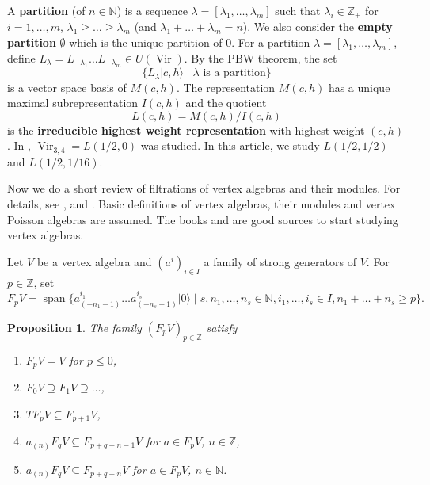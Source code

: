 \documentclass[12pt,a4paper]{article}
\newtheorem{proposition}{Proposition}
\DeclareMathOperator{\Vir}{Vir}
\DeclareMathOperator{\vspan}{span}
\newcommand{\vac}{|0\rangle}
\begin{document}
A \textbf{partition} (of $n\in \mathbb{N}$) is a sequence $\lambda=[\lambda_1,\dots, \lambda_m]$ such that $\lambda_i\in \mathbb{Z}_+$ for $i=1,\dots,m$, $\lambda_1\ge\dots\ge\lambda_m$ (and $\lambda_1+\dots+\lambda_m=n$).
We also consider the \textbf{empty partition} $\emptyset$ which is the unique partition of $0$.
For a partition $\lambda=[\lambda_1,\dots,\lambda_m]$, define $L_{\lambda}=L_{-\lambda_1}\dots L_{-\lambda_m}\in U(\Vir)$.
By the PBW theorem, the set
\begin{equation*}
  \{L_\lambda|c,h\rangle\mid \lambda\text{ is a partition}\}
\end{equation*}
is a vector space basis of $M(c,h)$.
The representation $M(c,h)$ has a unique maximal subrepresentation $I(c,h)$ and the quotient
\begin{equation*}
  L(c,h)=M(c,h)/I(c,h)
\end{equation*}
is the \textbf{irreducible highest weight representation} with highest weight $(c,h)$.
In \cite{andrews_singular_2022}, $\Vir_{3,4}=L(1/2,0)$ was studied.
In this article, we study $L(1/2,1/2)$ and $L(1/2,1/16)$.

Now we do a short review of filtrations of vertex algebras and their modules.
For details, see \cite{li_vertex_2002}, \cite{arakawa_remark_2012} and \cite{li_abelianizing_2005}.
Basic definitions of vertex algebras, their modules and vertex Poisson algebras are assumed.
The books \cite{kac_vertex_1998} and \cite{frenkel_vertex_2004} are good sources to start studying vertex algebras.

Let $V$ be a vertex algebra and $(a^i)_{i\in I}$ a family of strong generators of $V$.
For $p\in \mathbb{Z}$, set
\begin{equation*}
  F_pV=\vspan \{a^{i_1}_{(-n_1-1)}\dots a^{i_s}_{(-n_s-1)}\vac\mid s,n_1,\dots,n_s\in \mathbb{N}, i_1,\dots, i_s\in I, n_1+\dots +n_s\ge p\}.
\end{equation*}

\begin{proposition}
  \label{prp:1}
  The family $(F_pV)_{p\in \mathbb{Z}}$ satisfy
  \begin{enumerate}[label={(\alph*)}]
  \item $F_pV=V$ for $p\le 0$,
  \item $F_0V\supseteq F_1V\supseteq \dots$,
  \item $TF_pV\subseteq F_{p+1}V$,
  \item $a_{(n)}F_qV\subseteq F_{p+q-n-1}V$ for $a\in F_pV$, $n\in \mathbb{Z}$,
  \item $a_{(n)}F_qV\subseteq F_{p+q-n}V$ for $a\in F_pV$, $n\in \mathbb{N}$.
  \end{enumerate}
\end{proposition}
\end{document}
